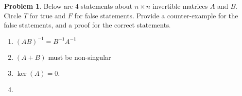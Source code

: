 \documentclass{amsart}
\theoremstyle{definition}
\newtheorem{prob}{Problem}
\begin{document}





\vspace{2em}

\begin{prob}
	Below are 4 statements about $n\times n$ invertible matrices $A$ and $B$. Circle $T$ for true and $F$ for false statements. Provide a counter-example for the false statements, and a proof for the correct statements. \begin{enumerate}
	\item $(AB)^{-1}=B^{-1}A^{-1}$
	\item $(A+B)$ must be non-singular
	\item $\ker(A)=0$.
	\item 
\end{enumerate}
\end{prob}
\end{document}
